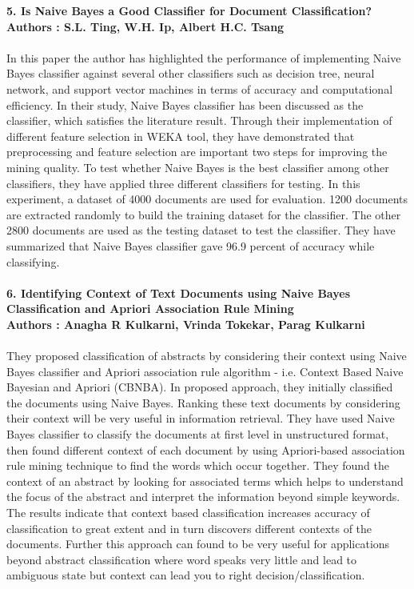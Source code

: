 \documentclass[12pt]{extreport}
\begin{document}
\newpage
\noindent
\textbf{5. Is Naive Bayes a Good Classifier for Document Classification?}\\\textbf{Authors : S.L. Ting, W.H. Ip, Albert H.C. Tsang}\\\\
In this paper the author has highlighted the performance of implementing Naive Bayes classifier against several other classifiers such as decision tree, neural network, and support vector machines in terms of accuracy and computational efficiency. In their study, Naive Bayes classifier has been discussed as the classifier, which satisfies the literature result. Through their implementation of different feature selection in WEKA tool, they have demonstrated that preprocessing and feature selection are important two steps for improving the mining quality. To test whether Naive Bayes is the best classifier among other classifiers, they have applied three different classifiers for testing. In this experiment, a dataset of 4000 documents are used for evaluation. 1200 documents are extracted randomly to build the training dataset for the classifier. The other 2800 documents are used as the testing dataset to test the classifier. They have summarized that Naive Bayes classifier gave 96.9 percent of accuracy while classifying.\\\\
\textbf{6. Identifying Context of Text Documents using Naive Bayes Classification and Apriori Association Rule Mining}\\
\textbf{Authors : Anagha R Kulkarni, Vrinda Tokekar, Parag Kulkarni }\\\\
They proposed classification of abstracts by considering their context using Naive Bayes classifier and Apriori association rule algorithm - i.e. Context Based Naive Bayesian and Apriori (CBNBA). In proposed approach, they initially classified the documents using Naive Bayes. Ranking these text documents by considering their context will be very useful in information retrieval. They have used Naive Bayes classifier to classify the documents at first level in unstructured format, then found different context of each document by using Apriori-based association rule mining technique to find the words which occur together. They found the context of an abstract by looking for associated terms which helps to understand the focus of the abstract and interpret the information beyond simple keywords. The results indicate that context based classification increases accuracy of classification to great extent and in turn discovers different contexts of the documents. Further this approach can found to be very useful for applications beyond abstract classification where word speaks very little and lead to ambiguous state but context can lead you to right decision/classification.\\\\
\end{document}
